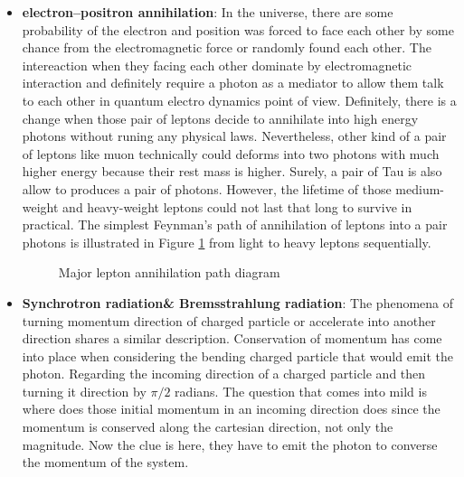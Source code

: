\begin{itemize}
    \item \textbf{electron–positron annihilation}:
    In the universe, there are some probability of the electron and 
    position was forced to face each other by some chance from
    the electromagnetic force or randomly found each other.
    The intereaction when they facing each other dominate by 
    electromagnetic interaction and definitely require a photon
    as a mediator to allow them talk to each other in quantum 
    electro dynamics point of view. Definitely, there is a change 
    when those pair of leptons decide to annihilate into high energy photons
    without runing any physical laws. Nevertheless, other kind of
    a pair of leptons like muon technically could deforms into two
    photons with much higher energy because their rest mass is higher.
    Surely, a pair of Tau is also allow to produces a pair of photons.
    However, the lifetime of those medium-weight and heavy-weight leptons
    could not last that long to survive in practical. The simplest 
    Feynman's path of annihilation of leptons into a pair photons 
    is illustrated in Figure \ref{fig:lepton_annihilation} from light 
    to heavy leptons sequentially.

    \begin{figure}[h!]
        \centering
            \hfill
            \hfill
            \caption{Major lepton annihilation path diagram}
           \label{fig:lepton_annihilation}
    \end{figure}

    \item \textbf{Synchrotron radiation\& Bremsstrahlung radiation}:
    The phenomena of turning momentum direction of charged particle
    or accelerate into another direction shares a similar
    description. Conservation of momentum has come into place when 
    considering the bending charged particle that would emit the
    photon. Regarding the incoming direction of a charged particle 
    and then turning it direction by $\pi/2$ radians. The question
    that comes into mild is where does those initial momentum in an 
    incoming direction does since the momentum is conserved along 
    the cartesian direction, not only the magnitude. Now the clue is 
    here, they have to emit the photon to converse the momentum of 
    the system.
    

\end{itemize}
